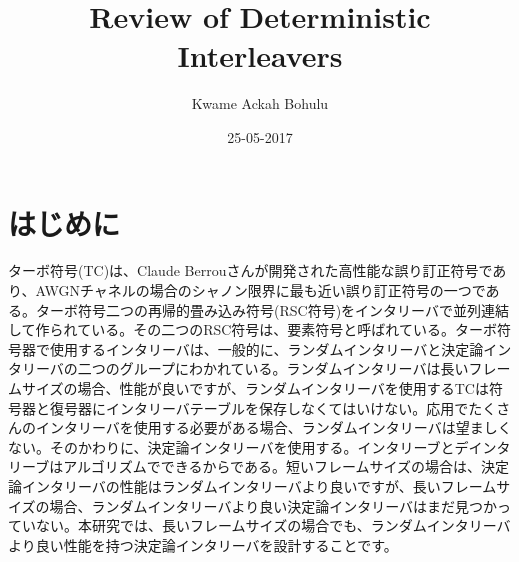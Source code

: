 \documentclass[20 pts]{article}
\title{Review of Deterministic Interleavers}
\author{Kwame Ackah Bohulu}
\date{25-05-2017}
\begin{document}
\maketitle


\section{はじめに}
ターボ符号(TC)は、Claude Berrouさんが開発された高性能な誤り訂正符号であり、AWGNチャネルの場合のシャノン限界に最も近い誤り訂正符号の一つである。ターボ符号二つの再帰的畳み込み符号(RSC符号)をインタリーバで並列連結して作られている。その二つのRSC符号は、要素符号と呼ばれている。ターボ符号器で使用するインタリーバは、一般的に、ランダムインタリーバと決定論インタリーバの二つのグループにわかれている。ランダムインタリーバは長いフレームサイズの場合、性能が良いですが、ランダムインタリーバを使用するTCは符号器と復号器にインタリーバテーブルを保存しなくてはいけない。応用でたくさんのインタリーバを使用する必要がある場合、ランダムインタリーバは望ましくない。そのかわりに、決定論インタリーバを使用する。インタリーブとデインタリーブはアルゴリズムでできるからである。短いフレームサイズの場合は、決定論インタリーバの性能はランダムインタリーバより良いですが、長いフレームサイズの場合、ランダムインタリーバより良い決定論インタリーバはまだ見つかっていない。本研究では、長いフレームサイズの場合でも、ランダムインタリーバより良い性能を持つ決定論インタリーバを設計することです。

\end{document}
